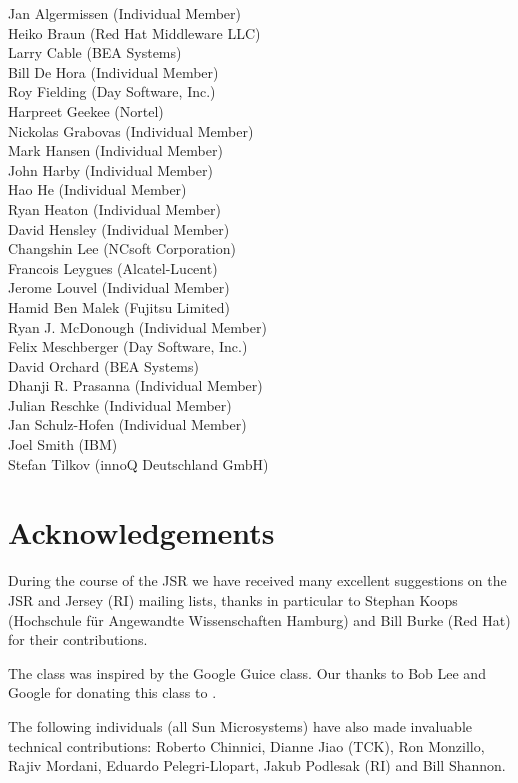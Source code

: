 Jan Algermissen (Individual Member) \\
Heiko Braun (Red Hat Middleware LLC) \\
Larry Cable (BEA Systems) \\
Bill De Hora (Individual Member) \\ 
Roy Fielding (Day Software, Inc.) \\
Harpreet Geekee (Nortel) \\
Nickolas Grabovas (Individual Member) \\
Mark Hansen (Individual Member) \\
John Harby (Individual Member) \\
Hao He (Individual Member) \\
Ryan Heaton (Individual Member) \\
David Hensley (Individual Member) \\
Changshin Lee (NCsoft Corporation) \\
Francois Leygues (Alcatel-Lucent) \\
Jerome Louvel (Individual Member) \\
Hamid Ben Malek (Fujitsu Limited) \\
Ryan J. McDonough (Individual Member) \\
Felix Meschberger (Day Software, Inc.) \\
David Orchard (BEA Systems) \\
Dhanji R. Prasanna (Individual Member) \\
Julian Reschke (Individual Member) \\
Jan Schulz-Hofen (Individual Member) \\
Joel Smith (IBM) \\
Stefan Tilkov (innoQ Deutschland GmbH)

\section{Acknowledgements}

During the course of the JSR we have received many excellent suggestions on the JSR and Jersey (RI) mailing lists, thanks in particular to Stephan Koops (Hochschule f\"{u}r Angewandte Wissenschaften Hamburg) and Bill Burke (Red Hat) for their contributions. 

The  class was inspired by the Google Guice  class. Our thanks to Bob Lee and Google for donating this class to \jaxrs.

The following individuals (all Sun Microsystems) have also made invaluable technical contributions: Roberto Chinnici, Dianne Jiao (TCK), Ron Monzillo, Rajiv Mordani, Eduardo Pelegri-Llopart, Jakub Podlesak (RI) and Bill Shannon.
